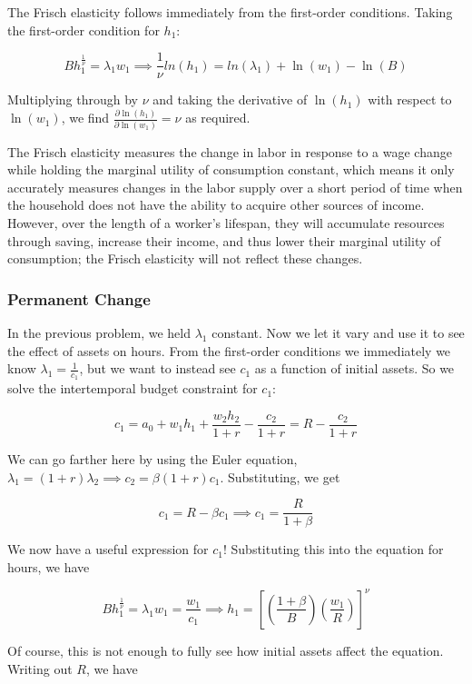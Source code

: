 \documentclass[12pt, letterpaper, parskip = full]{article}
\begin{document}
    The Frisch elasticity follows immediately from the first-order conditions. Taking the first-order condition for \(h_1\):

    \[ B h_1^{\frac{1}{\nu}} = \lambda_1 w_1 \implies \frac{1}{\nu} ln(h_1) = ln(\lambda_1) + \ln(w_1) - \ln(B)   \]

    Multiplying through by \(\nu\) and taking the derivative of \(\ln(h_1)\) with respect to \(\ln(w_1)\), we find \(\frac{\partial \ln(h_1)}{\partial \ln(w_1)} = \nu\) as required.

    The Frisch elasticity measures the change in labor in response to a wage change while holding the marginal utility of consumption constant, which means it only accurately measures changes in the labor supply over a short period of time when the household does not have the ability to acquire other sources of income. However, over the length of a worker's lifespan, they will accumulate resources through saving, increase their income, and thus lower their marginal utility of consumption; the Frisch elasticity will not reflect these changes.

    \subsubsection{Permanent Change}

    In the previous problem, we held \(\lambda_1\) constant. Now we let it vary and use it to see the effect of assets on hours. From the first-order conditions we immediately we know \(\lambda_1 = \frac{1}{c_1}\), but we want to instead see \(c_1\) as a function of initial assets. So we solve the intertemporal budget constraint for \(c_1\):

    \[ c_1 = a_0 + w_1 h_1 + \frac{w_2 h_2}{1+r} - \frac{c_2}{1+r} = R - \frac{c_2}{1+r}   \]

    We can go farther here by using the Euler equation, \(\lambda_1 = (1+r) \lambda_2 \implies c_2 = \beta (1+r) c_1\). Substituting, we get

    \[ c_1 = R - \beta c_1 \implies c_1 = \frac{R}{1+\beta}   \]

    We now have a useful expression for \(c_1\)! Substituting this into the equation for hours, we have
    
    \[ B h_1^{\frac{1}{\nu}} = \lambda_1 w_1 = \frac{w_1}{c_1} \implies h_1 = \left[ \left(\frac{1+\beta}{B}\right) \left(\frac{w_1}{R}\right)  \right]^\nu   \]

    Of course, this is not enough to fully see how initial assets affect the equation. Writing out \(R\), we have
\end{document}
